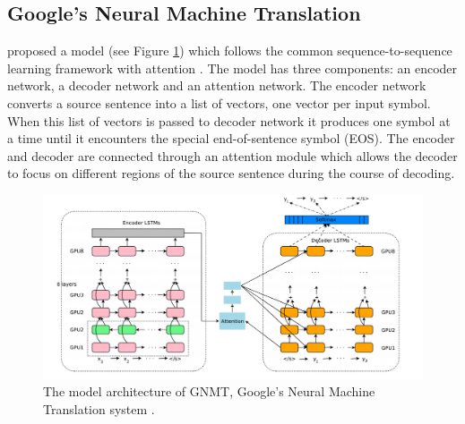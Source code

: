 \subsection{Google's Neural Machine Translation}
\cite{45610} proposed a model (see Figure \ref{gnmt1}) which follows the common sequence-to-sequence learning framework \citep{NIPS2014_5346} with attention \citep{DBLP:journals/corr/BahdanauCB14}. The model has three components: an encoder network, a decoder network and an attention network. The encoder network converts a source sentence into a list of vectors, one vector per input symbol. When this list of vectors is passed to decoder network it produces one symbol at a time until it encounters the special end-of-sentence symbol (EOS). The encoder and decoder are connected through an attention module which allows the decoder to focus on different regions of the source sentence during the course of decoding. 
\begin{figure}[h]
\includegraphics[width=\textwidth]{figures/gnmt1.png}
\caption{ The model architecture of GNMT, Google’s Neural Machine Translation system \citep{45610}. } \label{gnmt1}
\end{figure}


